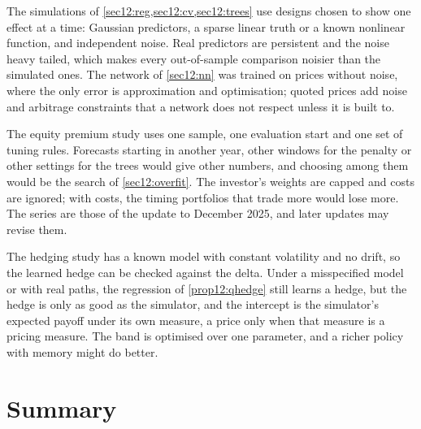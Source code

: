 \begin{chapterrefs}
The simulations of \cref{sec12:reg,sec12:cv,sec12:trees} use designs chosen to show one effect at a time:
Gaussian predictors, a sparse linear truth or a known nonlinear function, and independent noise. Real
predictors are persistent and the noise heavy tailed, which makes every out-of-sample comparison noisier
than the simulated ones. The network of \cref{sec12:nn} was trained on prices without noise, where the only
error is approximation and optimisation; quoted prices add noise and arbitrage constraints that a network
does not respect unless it is built to.

The equity premium study uses one sample, one evaluation start and one set of tuning rules. Forecasts
starting in another year, other windows for the penalty or other settings for the trees would give other
numbers, and choosing among them would be the search of \cref{sec12:overfit}. The investor's weights are
capped and costs are ignored; with costs, the timing portfolios that trade more would lose more. The series
are those of the update to December 2025, and later updates may revise them.

The hedging study has a known model with constant volatility and no drift, so the learned hedge can be
checked against the delta. Under a misspecified model or with real paths, the regression of
\cref{prop12:qhedge} still learns a hedge, but the hedge is only as good as the simulator, and the intercept is the simulator's
expected payoff under its own measure, a price only when that measure is a pricing measure. The band is optimised over one parameter, and a richer policy
with memory might do better.

\FloatBarrier
\section{Summary}
\label{sec12:summary}


\end{chapterrefs}

